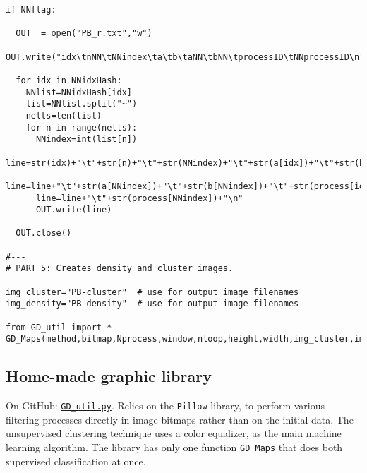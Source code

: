 \documentclass[oneside,10pt]{book}
\begin{document}
\begin{lstlisting}
if NNflag:

  OUT  = open("PB_r.txt","w")
  OUT.write("idx\tnNN\tNNindex\ta\tb\taNN\tbNN\tprocessID\tNNprocessID\n")

  for idx in NNidxHash:
    NNlist=NNidxHash[idx]
    list=NNlist.split("~")
    nelts=len(list)
    for n in range(nelts):
      NNindex=int(list[n])
      line=str(idx)+"\t"+str(n)+"\t"+str(NNindex)+"\t"+str(a[idx])+"\t"+str(b[idx])
      line=line+"\t"+str(a[NNindex])+"\t"+str(b[NNindex])+"\t"+str(process[idx])
      line=line+"\t"+str(process[NNindex])+"\n"
      OUT.write(line)

  OUT.close()

#---
# PART 5: Creates density and cluster images.

img_cluster="PB-cluster"  # use for output image filenames
img_density="PB-density"  # use for output image filenames

from GD_util import *
GD_Maps(method,bitmap,Nprocess,window,nloop,height,width,img_cluster,img_density)
\end{lstlisting}

\subsection{Home-made graphic library}\label{fc223}

On GitHub: \href{https://github.com/VincentGranville/Point-Processes/blob/main/Source\%20Code/GD_util.py}{\texttt{GD\_util.py}}. Relies
on the \texttt{Pillow} library, to perform various filtering processes directly in image bitmaps rather than on the initial data. The unsupervised clustering technique uses a color equalizer, as the main machine learning algorithm. The library has only
one function \texttt{GD\_Maps}  that does both supervised classification at once.
\end{document}
